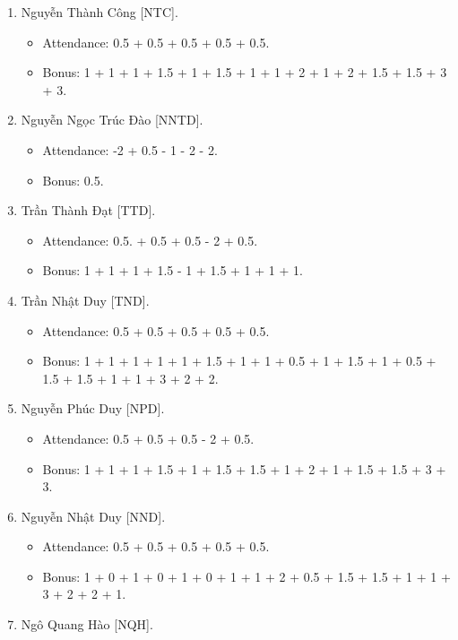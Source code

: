 \documentclass{article}
\begin{document}
\begin{enumerate}
    \item {\sc Nguyễn Thành Công [NTC].}
    \begin{itemize}
        \item Attendance: 0.5 + 0.5 + 0.5 + 0.5 + 0.5.
        \item Bonus: 1 + 1 + 1 + 1.5 + 1 + 1.5 + 1 + 1 + 2 + 1 + 2 + 1.5 + 1.5 + 3 + 3.
    \end{itemize}
    \item {\sc Nguyễn Ngọc Trúc Đào [NNTD].}
    \begin{itemize}
        \item Attendance: -2 + 0.5 - 1 - 2 - 2.
        \item Bonus: 0.5.
    \end{itemize}
    \item {\sc Trần Thành Đạt [TTD].}
    \begin{itemize}
        \item Attendance: 0.5. + 0.5 + 0.5 - 2 + 0.5.
        \item Bonus: 1 + 1 + 1 + 1.5 - 1 + 1.5 + 1 + 1 + 1.
    \end{itemize}
    \item {\sc Trần Nhật Duy [TND].}
    \begin{itemize}
        \item Attendance: 0.5 + 0.5 + 0.5 + 0.5 + 0.5.
        \item Bonus: 1 + 1 + 1 + 1 + 1 + 1.5 + 1 + 1 + 0.5 + 1 + 1.5 + 1 + 0.5 + 1.5 + 1.5 + 1 + 1 + 3 + 2 + 2.
    \end{itemize}
    \item {\sc Nguyễn Phúc Duy [NPD].}
    \begin{itemize}
        \item Attendance: 0.5 + 0.5 + 0.5 - 2 + 0.5.
        \item Bonus: 1 + 1 + 1 + 1.5 + 1 + 1.5 + 1.5 + 1 + 2 + 1 + 1.5 + 1.5 + 3 + 3.
    \end{itemize}
    \item {\sc Nguyễn Nhật Duy [NND].}
    \begin{itemize}
        \item Attendance: 0.5 + 0.5 + 0.5 + 0.5 + 0.5.
        \item Bonus: 1 + 0 + 1 + 0 + 1 + 0 + 1 + 1 + 2 + 0.5 + 1.5 + 1.5 + 1 + 1 + 3 + 2 + 2 + 1.
    \end{itemize}
    \item {\sc Ngô Quang Hào [NQH].}
    \begin{itemize}

\end{itemize}
\end{enumerate}
\end{document}
